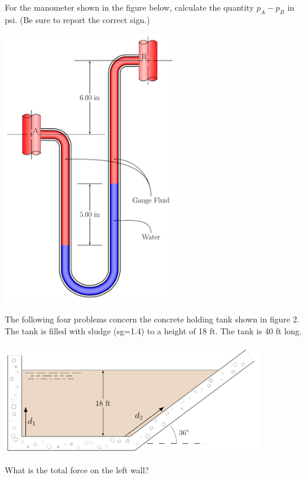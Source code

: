 \documentclass[multi,preview,varwidth=false,border=5,12pt]{standalone}
\begin{document}
\begin{question}
For the manometer shown in the figure below, calculate the quantity
$p_A - p_B$ in psi.  (Be sure to report the correct sign.)

\includegraphics[width=3in]{imgs/mono4.pdf}


\begin{solution}
\end{solution}

\end{question}


\begin{question}

The following four problems concern the concrete
holding tank shown in figure 2. The tank is filled
with sludge (sg=1.4) to a height of 18 ft. The tank
is 40 ft long.

\includegraphics[width=4.5in]{imgs/SlurryWall.png}

What is the total force on the left wall?

\end{question}
\end{document}
